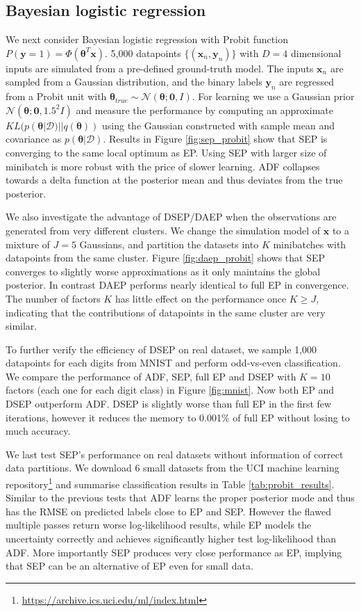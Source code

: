 \subsection{Bayesian logistic regression}
We next consider Bayesian logistic regression with Probit function $P(\bm{y} = 1) = \Phi(\bm{\theta}^T \bm{x})$. 5,000 datapoints $\{ (\bm{x}_n, \bm{y}_n) \}$ with $D=4$ dimensional inputs are simulated from a pre-defined ground-truth model. The inputs $\bm{x}_n$ are sampled from a Gaussian distribution, and the binary labels $\bm{y}_n$ are regressed from a Probit unit with $\bm{\theta}_{true} \sim \mathcal{N}(\bm{\theta}; \bm{0}, I)$. For learning we use a Gaussian prior $\mathcal{N}(\bm{\theta}; \bm{0}, 1.5^2 I)$ and measure the performance by computing an approximate $KL(p(\bm{\theta}|\mathcal{D}) || q(\bm{\theta}))$ using the Gaussian constructed with sample mean and covariance as $p(\bm{\theta}|\mathcal{D})$.
%
Results in Figure \ref{fig:sep_probit} show that SEP is converging to the same local optimum as EP. Using SEP with larger size of minibatch is more robust with the price of slower learning. ADF collapses towards a delta function at the posterior mean and thus deviates from the true posterior. 

We also investigate the advantage of DSEP/DAEP when the observations are generated from very different clusters. We change the simulation model of $\bm{x}$ to a mixture of $J=5$ Gaussians, and partition the datasets into $K$ minibatches with datapoints from the same cluster. Figure \ref{fig:daep_probit} shows that SEP converges to slightly worse approximations as it only maintains the global posterior. In contrast DAEP performs nearly identical to full EP in convergence. The number of factors $K$ has little effect on the performance once $K \geq J$, indicating that the contributions of datapoints in the same cluster are very similar. 

To further verify the efficiency of DSEP on real dataset, we sample 1,000 datapoints for each digits from MNIST and perform odd-vs-even classification. We compare the performance of ADF, SEP, full EP and DSEP with $K=10$ factors (each one for each digit class) in Figure \ref{fig:mnist}. Now both EP and DSEP outperform ADF. DSEP is slightly worse than full EP in the first few iterations, however it reduces the memory to 0.001\% of full EP without losing to much accuracy.

We last test SEP's performance on real datasets without information of correct data partitions. We download 6 small datasets from the UCI machine learning repository\footnote{\url{https://archive.ics.uci.edu/ml/index.html}} and summarise classification results in Table \ref{tab:probit_results}. Similar to the previous tests that ADF learns the proper posterior mode and thus has the RMSE on predicted labels close to EP and SEP. However the flawed multiple passes return worse log-likelihood results, while EP models the uncertainty correctly and achieves significantly higher test log-likelihood than ADF. More importantly SEP produces very close performance as EP, implying that SEP can be an alternative of EP even for small data.

